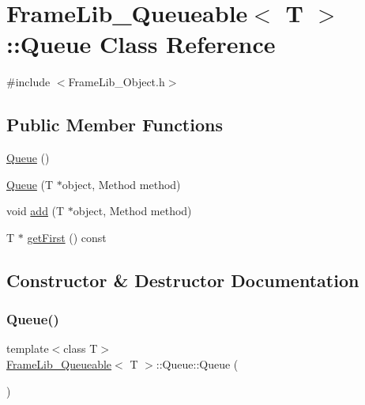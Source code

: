 \hypertarget{class_frame_lib___queueable_1_1_queue}{}\section{Frame\+Lib\+\_\+\+Queueable$<$ T $>$\+:\+:Queue Class Reference}
\label{class_frame_lib___queueable_1_1_queue}


{\ttfamily \#include $<$Frame\+Lib\+\_\+\+Object.\+h$>$}

\subsection*{Public Member Functions}
\begin{DoxyCompactItemize}
\item 
\hyperlink{class_frame_lib___queueable_1_1_queue_a5eb25b5751d5cc25331aa5e1b4fcb6ae}{Queue} ()
\item 
\hyperlink{class_frame_lib___queueable_1_1_queue_af701d261343c894ba4cde0aa8dd99bd1}{Queue} (T $\ast$object, Method method)
\item 
void \hyperlink{class_frame_lib___queueable_1_1_queue_abf0d41d8f1e7988e1bde9b8a5f899f30}{add} (T $\ast$object, Method method)
\item 
T $\ast$ \hyperlink{class_frame_lib___queueable_1_1_queue_a57e16be316a37b9b6d0d5cf7267e4d12}{get\+First} () const
\end{DoxyCompactItemize}


\subsection{Constructor \& Destructor Documentation}
\mbox{\label{class_frame_lib___queueable_1_1_queue_a5eb25b5751d5cc25331aa5e1b4fcb6ae}} 
\subsubsection{\texorpdfstring{Queue()}{Queue()}\hspace{0.1cm}{\footnotesize\ttfamily [1/2]}}
{\footnotesize\ttfamily template$<$class T$>$ \\
\hyperlink{class_frame_lib___queueable}{Frame\+Lib\+\_\+\+Queueable}$<$ T $>$\+::Queue\+::\+Queue (\begin{DoxyParamCaption}{ }\end{DoxyParamCaption})\hspace{0.3cm}{\ttfamily [inline]}}


